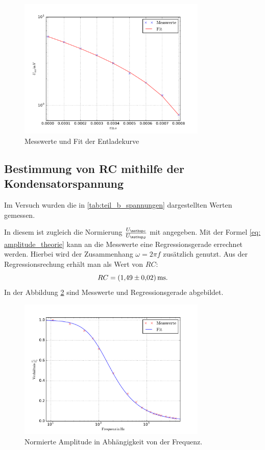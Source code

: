 \begin{figure}
  \centering
  \includegraphics [width=0.8\textwidth]{pics/teil_a_entladung.pdf}
  \caption{Messwerte und Fit der Entladekurve}
  \label{fig:plot_teila}
\end{figure}


\subsection{Bestimmung von RC mithilfe der Kondensatorspannung}
Im Versuch wurden die in \ref{tab:teil_b_spannungen} dargestellten Werten gemessen.



In diesem ist zugleich die Normierung $\frac{U\ua{c}}{U\ua{g}}$
mit angegeben.
Mit der Formel \eqref{eq: amplitude_theorie} kann an die Messwerte eine Regressionsgerade
errechnet werden. Hierbei wird der Zusammenhang $\omega=2\pi f$ zusätzlich genutzt.
Aus der Regressionsrechung erhält man als Wert von $RC$:
\begin{equation}
  \label{eq:rc_teilb}
  RC=\SI{1.49\pm0.02}{\milli\second}.
\end{equation}
In der Abbildung \ref{fig:teilb} sind Messwerte und Regressionsgerade abgebildet.

\begin{figure}
  \centering
  \includegraphics[width=0.8\textwidth]{pics/u_cdurchu_g.pdf}
  \caption{Normierte Amplitude in Abhängigkeit von der Frequenz.}
  \label{fig:teilb}
\end{figure}

